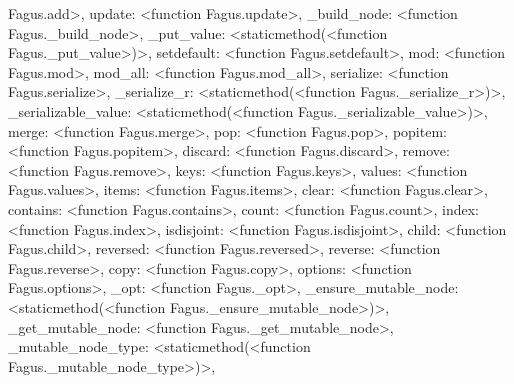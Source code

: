 \documentclass[a4paper,10pt,english]{sphinxmanual}
\begin{document}
\begin{fulllineitems}
\begin{fulllineitems}
Fagus.add\textgreater{}, \textquotesingle{}update\textquotesingle{}: \textless{}function Fagus.update\textgreater{}, \textquotesingle{}\_build\_node\textquotesingle{}: \textless{}function Fagus.\_build\_node\textgreater{}, \textquotesingle{}\_put\_value\textquotesingle{}: \textless{}staticmethod(\textless{}function Fagus.\_put\_value\textgreater{})\textgreater{}, \textquotesingle{}setdefault\textquotesingle{}: \textless{}function Fagus.setdefault\textgreater{}, \textquotesingle{}mod\textquotesingle{}: \textless{}function Fagus.mod\textgreater{}, \textquotesingle{}mod\_all\textquotesingle{}: \textless{}function Fagus.mod\_all\textgreater{}, \textquotesingle{}serialize\textquotesingle{}: \textless{}function Fagus.serialize\textgreater{}, \textquotesingle{}\_serialize\_r\textquotesingle{}: \textless{}staticmethod(\textless{}function Fagus.\_serialize\_r\textgreater{})\textgreater{}, \textquotesingle{}\_serializable\_value\textquotesingle{}: \textless{}staticmethod(\textless{}function Fagus.\_serializable\_value\textgreater{})\textgreater{}, \textquotesingle{}merge\textquotesingle{}: \textless{}function Fagus.merge\textgreater{}, \textquotesingle{}pop\textquotesingle{}: \textless{}function Fagus.pop\textgreater{}, \textquotesingle{}popitem\textquotesingle{}: \textless{}function Fagus.popitem\textgreater{}, \textquotesingle{}discard\textquotesingle{}: \textless{}function Fagus.discard\textgreater{}, \textquotesingle{}remove\textquotesingle{}: \textless{}function Fagus.remove\textgreater{}, \textquotesingle{}keys\textquotesingle{}: \textless{}function Fagus.keys\textgreater{}, \textquotesingle{}values\textquotesingle{}: \textless{}function Fagus.values\textgreater{}, \textquotesingle{}items\textquotesingle{}: \textless{}function Fagus.items\textgreater{}, \textquotesingle{}clear\textquotesingle{}: \textless{}function Fagus.clear\textgreater{}, \textquotesingle{}contains\textquotesingle{}: \textless{}function Fagus.contains\textgreater{}, \textquotesingle{}count\textquotesingle{}: \textless{}function Fagus.count\textgreater{}, \textquotesingle{}index\textquotesingle{}: \textless{}function Fagus.index\textgreater{}, \textquotesingle{}isdisjoint\textquotesingle{}: \textless{}function Fagus.isdisjoint\textgreater{}, \textquotesingle{}child\textquotesingle{}: \textless{}function Fagus.child\textgreater{}, \textquotesingle{}reversed\textquotesingle{}: \textless{}function Fagus.reversed\textgreater{}, \textquotesingle{}reverse\textquotesingle{}: \textless{}function Fagus.reverse\textgreater{}, \textquotesingle{}copy\textquotesingle{}: \textless{}function Fagus.copy\textgreater{}, \textquotesingle{}options\textquotesingle{}: \textless{}function Fagus.options\textgreater{}, \textquotesingle{}\_opt\textquotesingle{}: \textless{}function Fagus.\_opt\textgreater{}, \textquotesingle{}\_ensure\_mutable\_node\textquotesingle{}: \textless{}staticmethod(\textless{}function Fagus.\_ensure\_mutable\_node\textgreater{})\textgreater{}, \textquotesingle{}\_get\_mutable\_node\textquotesingle{}: \textless{}function Fagus.\_get\_mutable\_node\textgreater{}, \textquotesingle{}\_mutable\_node\_type\textquotesingle{}: \textless{}staticmethod(\textless{}function Fagus.\_mutable\_node\_type\textgreater{})\textgreater{}, 
\end{fulllineitems}
\end{fulllineitems}
\end{document}
